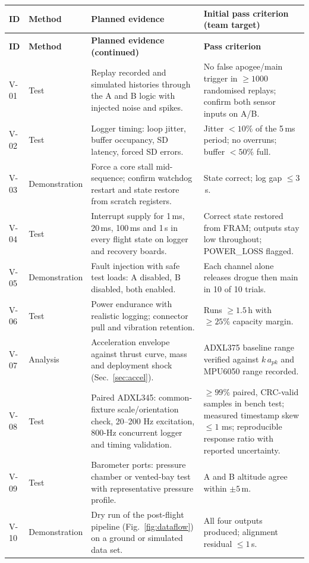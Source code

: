 \small
\begingroup
{}
\begin{longtable}{@{}L{11mm}L{23mm}L{70mm}L{42mm}@{}}
\toprule{}\textbf{ID}&\textbf{Method}&\textbf{Planned evidence}&\textbf{Initial pass criterion (team target)}\\\midrule\endfirsthead
\toprule{}\textbf{ID}&\textbf{Method}&\textbf{Planned evidence (continued)}&\textbf{Pass criterion}\\\midrule\endhead
\bottomrule\endlastfoot
V-01 & Test & Replay recorded and simulated histories through the A and B logic with injected noise and spikes. & No false apogee/main trigger in $\ge1000$ randomised replays; confirm both sensor inputs on A/B.\\
V-02 & Test & Logger timing: loop jitter, buffer occupancy, SD latency, forced SD errors. & Jitter $<10\%$ of the 5\,ms period; no overruns; buffer $<50\%$ full.\\
V-03 & Demonstration & Force a core stall mid-sequence; confirm watchdog restart and state restore from scratch registers. & State correct; log gap $\le3$\,s.\\
V-04 & Test & Interrupt supply for 1\,ms, 20\,ms, 100\,ms and 1\,s in every flight state on logger and recovery boards. & Correct state restored from FRAM; outputs stay low throughout; POWER\_LOSS flagged.\\
V-05 & Demonstration & Fault injection with safe test loads: A disabled, B disabled, both enabled. & Each channel alone releases drogue then main in 10 of 10 trials.\\
V-06 & Test & Power endurance with realistic logging; connector pull and vibration retention. & Runs $\ge1.5$\,h with $\ge25\%$ capacity margin.\\
V-07 & Analysis & Acceleration envelope against thrust curve, mass and deployment shock (Sec.~\ref{sec:accel}). & ADXL375 baseline range verified against $k\,a_{pk}$ and MPU6050 range recorded.\\
V-08 & Test & Paired ADXL345: common-fixture scale/orientation check, 20--200 Hz excitation, 800-Hz concurrent logger and timing validation. & $\ge99\%$ paired, CRC-valid samples in bench test; measured timestamp skew $\le1$ ms; reproducible response ratio with reported uncertainty.\\
V-09 & Test & Barometer ports: pressure chamber or vented-bay test with representative pressure profile. & A and B altitude agree within $\pm5$\,m.\\
V-10 & Demonstration & Dry run of the post-flight pipeline (Fig.~\ref{fig:dataflow}) on a ground or simulated data set. & All four outputs produced; alignment residual $\le1$\,s.\\

\end{longtable}
